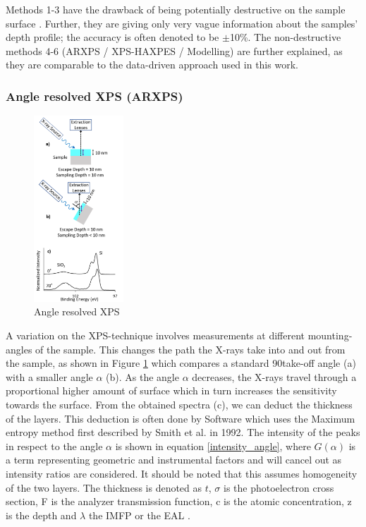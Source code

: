 Methods 1-3 have the drawback of being potentially destructive on the sample surface \cite{greczynski_towards_2021}. Further, they are giving only very vague information about the samples’ depth profile; the accuracy is often denoted to be $\pm$10\%.
The non-destructive methods 4-6 (ARXPS / XPS-HAXPES / Modelling) are further explained, as they are comparable to the data-driven approach used in this work.

\subsubsection{Angle resolved XPS (ARXPS)}
\begin{figure}[t]
    \centering
    \includegraphics[width=0.3\textwidth]{Figures/ARXPS.png}
    \caption{Angle resolved XPS \cite{stevie_introduction_2020}}
    \label{fig:arxps}
\end{figure}
A variation on the XPS-technique involves measurements at different mounting-angles of the sample.
This changes the path the X-rays take into and out from the sample, as shown in Figure \ref{fig:arxps} which compares a standard 90\textdegree take-off angle (a) with a smaller angle $\alpha$ (b). As the angle $\alpha$ decreases, the X-rays travel through a proportional higher amount of surface which in turn increases the sensitivity towards the surface. From the obtained spectra (c), we can deduct the thickness of the layers. This deduction is often done by Software which uses the Maximum entropy method first described by Smith et al. \cite{smith_maximum_1992} in 1992.
The intensity of the peaks in respect to the angle $\alpha$ is shown in equation \ref{intensity_angle}, where $G(\alpha)$ is a term representing geometric and instrumental factors and will cancel out as intensity ratios are considered. It should be noted that this assumes homogeneity of the two layers.
The thickness is denoted as $t$,
$\sigma$ is the photoelectron cross section,
F is the analyzer transmission function,
c is the atomic concentration,
z is the depth and $\lambda$ the IMFP or the EAL
\cite{paynter_arxps_2009}.

